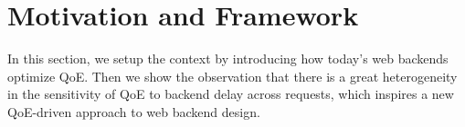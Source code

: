 
\section{Motivation and Framework}
In this section, we setup the context by introducing how today's web backends optimize QoE.
Then we show the observation that there is a great heterogeneity in the sensitivity of QoE to backend delay across requests, which inspires a new QoE-driven approach to web backend design.

